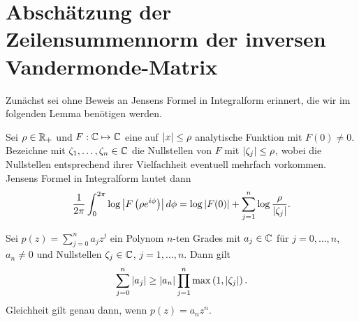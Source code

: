 \section{Abschätzung der Zeilensummennorm der inversen Vandermonde-Matrix}

Zunächst sei ohne Beweis an Jensens Formel in Integralform erinnert, die wir im
folgenden Lemma benötigen werden.
\begin{theorem}
    \label{thm:jensens_formula}
    Sei $\rho \in \mathbb{R}_+$ und $F: \mathbb{C} \mapsto \mathbb{C}$ eine auf $\left\lvert x \right\rvert \leq \rho$
    analytische Funktion mit $F(0) \neq 0$.
    Bezeichne mit $\zeta_1, \dots, \zeta_n \in \mathbb{C}$ die Nullstellen von $F$ mit
    $\left\lvert \zeta_j \right\rvert \leq \rho$, wobei die Nullstellen entsprechend ihrer
    Vielfachheit eventuell mehrfach vorkommen.
    Jensens Formel in Integralform lautet dann
    \begin{equation}
        \frac{1}{2\pi} \int_{0}^{2 \pi} \log \left\lvert F\left( \rho e^{i\phi} \right) \right\rvert d\phi
        = \log \left\lvert F(0) \right\rvert + \sum_{j=1}^{n} \log \frac{\rho}{\left\lvert \zeta_j \right\rvert}.
    \end{equation}
\end{theorem}

\begin{lemma}
    \label{lemma:polynom_coefficient_sum_inequality}
    Sei $p(z) = \sum_{j = 0}^{n} a_j z^j$ ein Polynom $n$-ten Grades mit
    $a_j \in \mathbb{C}$ für $j = 0, \dots, n$, $a_n \neq 0$ und Nullstellen
    $\zeta_j \in \mathbb{C}$, $j = 1, \dots, n$.
    Dann gilt
    \begin{equation}
        \label{eq:polynom_coefficient_sum_inequality}
        \sum_{j=0}^{n} \left\lvert a_j \right\rvert \geq \left\lvert a_n \right\rvert \prod_{j=1}^{n} \max \left(1, \left\lvert \zeta_j \right\rvert \right).
    \end{equation}
    Gleichheit gilt genau dann, wenn $p(z) = a_n z^n$.
\end{lemma}

